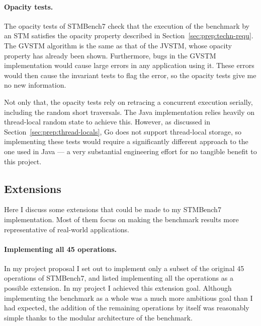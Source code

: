 \documentclass[12pt,a4paper,oneside,openright]{report}
\begin{document}
\paragraph{Opacity tests.} The opacity tests of STMBench7 check that
the execution of the benchmark by an STM satisfies the opacity
property described in Section~\ref{sec:prep:techn-requ}. The GVSTM
algorithm is the same as that of the JVSTM, whose opacity property has
already been shown. Furthermore, bugs in the GVSTM implementation
would cause large errors in any application using it. These errors
would then cause the invariant tests to flag the error, so the opacity
tests give me no new information.

Not only that, the opacity tests rely on retracing a concurrent
execution serially, including the random short traversals. The Java
implementation relies heavily on thread-local random state to achieve
this. However, as discussed in Section~\ref{sec:prep:thread-locals},
Go does not support thread-local storage, so implementing these tests
would require a significantly different approach to the one used in
Java --- a very substantial engineering effort for no tangible benefit
to this project.

\subsection{Extensions}
\label{sec:impl:possible-extensions}

Here I discuss some extensions that could be made to my STMBench7
implementation. Most of them focus on making the benchmark results
more representative of real-world applications.

\paragraph{Implementing all 45 operations.} In my project proposal I
set out to implement only a subset of the original 45 operations of
STMBench7, and listed implementing all the operations as a possible
extension. In my project I achieved this extension goal. Although
implementing the benchmark as a whole was a much more ambitious goal
than I had expected, the addition of the remaining operations by
itself was reasonably simple thanks to the modular architecture of the
benchmark.
\end{document}
